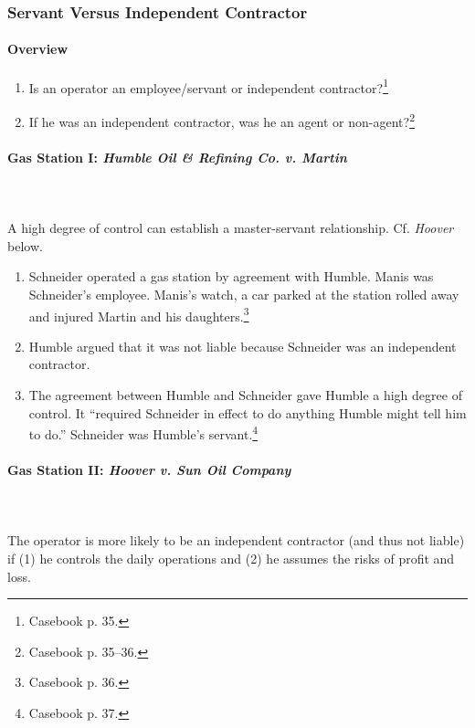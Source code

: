 \subsubsection{Servant Versus Independent Contractor}

\paragraph{Overview}

\begin{enumerate}
    \item Is an operator an employee/servant or independent 
    contractor?\footnote{Casebook p. 35.}
    \item If he was an independent contractor, was he an agent or 
    non-agent?\footnote{Casebook p. 35--36.}
\end{enumerate}

\paragraph{Gas Station I: \emph{Humble Oil \& Refining Co. v. Martin}}
~\\\\
A high degree of control can establish a master-servant relationship. Cf. 
\emph{Hoover} below.

\begin{enumerate}
    \item Schneider operated a gas station by agreement with Humble. Manis was 
    Schneider's employee. Manis's watch, a car parked at the station rolled 
    away and injured Martin and his daughters.\footnote{Casebook p. 36.}
    \item Humble argued that it was not liable because Schneider was an 
    independent contractor.
    \item The agreement between Humble and Schneider gave Humble a high degree 
    of control. It ``required Schneider in effect to do anything Humble might 
    tell him to do.'' Schneider was Humble's servant.\footnote{Casebook p. 37.}
\end{enumerate}

\paragraph{Gas Station II: \emph{Hoover v. Sun Oil Company}}
~\\\\
The operator is more likely to be an independent contractor (and thus not 
liable) if (1) he controls the daily operations and (2) he assumes the risks 
of profit and loss.

